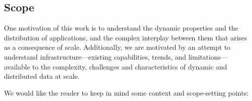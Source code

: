 


\subsection{Scope}




One motivation of this work is to understand the dynamic properties
and the distribution of applications, and the complex interplay
between them that arises as a consequence of scale.  Additionally, we
are motivated by an attempt to understand infrastructure---existing
capabilities, trends, and limitations---available to the complexity,
challenges and characteristics of dynamic and distributed data at
scale.

We would like the reader to keep in mind some context and scope-setting points:


